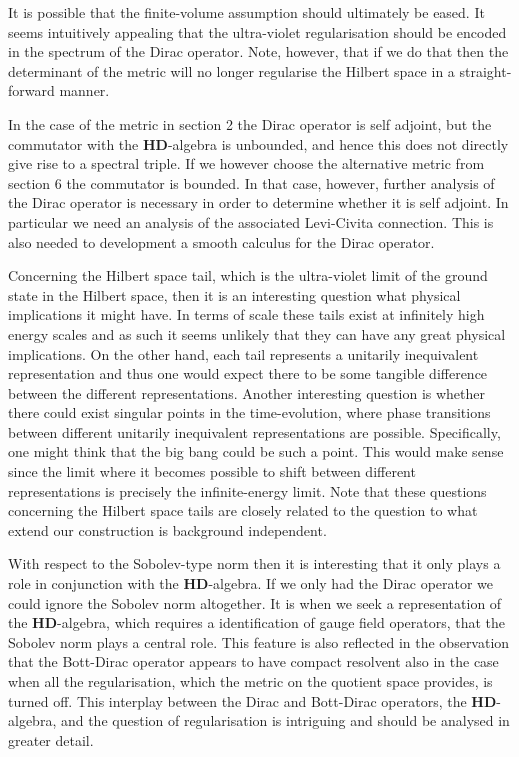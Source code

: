 \documentclass[letterpaper,11pt]{article}
\begin{document}
It is possible that the finite-volume assumption should ultimately be eased. It seems intuitively appealing that the ultra-violet regularisation should be encoded in the spectrum of the Dirac operator. Note, however, that if we do that then the determinant of the metric will no longer regularise the Hilbert space in a straight-forward manner. 


In the case of the metric in section 2 the Dirac operator is self adjoint, but the commutator with the $\mathbf{HD}$-algebra is unbounded, and hence this does not directly give rise to a spectral triple. If we however choose the alternative metric from section 6 the commutator is bounded. In that case, however, further analysis of the Dirac operator is necessary in order to determine whether it is self adjoint. In particular we need an analysis of the associated Levi-Civita connection. This is also needed to development a smooth calculus for the Dirac operator.   


Concerning the Hilbert space tail, which is the ultra-violet limit of the ground state in the Hilbert space, then it is an interesting question what physical implications it might have. In terms of scale these tails exist at infinitely high energy scales and as such it seems unlikely that they can have any great physical implications. On the other hand, each tail represents a unitarily inequivalent representation and thus one would expect there to be some tangible difference between the different representations. Another interesting question is whether there could exist singular points in the time-evolution, where phase transitions between different unitarily inequivalent representations are possible. Specifically, one might think that the big bang could be such a point. This would make sense since the limit where it becomes possible to shift between different representations is precisely the infinite-energy limit. Note that these questions concerning the Hilbert space tails are closely related to the question to what extend our construction is background independent.

With respect to the Sobolev-type norm then it is interesting that it only plays a role in conjunction with the $\mathbf{HD}$-algebra. If we only had the Dirac operator we could ignore the Sobolev norm altogether. It is when we seek a representation of the $\mathbf{HD}$-algebra, which requires a identification of gauge field operators, that the Sobolev norm plays a central role. This feature is also reflected in the observation that the Bott-Dirac operator appears to have compact resolvent also in the case when all the regularisation, which the metric on the quotient space provides, is turned off. This interplay between the Dirac and Bott-Dirac operators, the $\mathbf{HD}$-algebra, and the question of regularisation is intriguing and should be analysed in greater detail.
\end{document}
